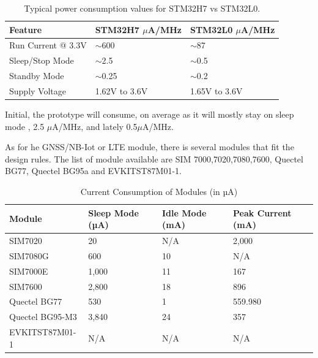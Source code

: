 \begin{table}[h!]
    \centering
    \begin{tabular}{l|l|l}
    Feature & STM32H7 $\mu$A/MHz& STM32L0 $\mu$A/MHz\\ 
    \hline
    Run Current @ 3.3V & $\sim$600      & $\sim$87 \\
    Sleep/Stop Mode    & $\sim$2.5      & $\sim$0.5 \\
    Standby Mode       & $\sim$0.25     & $\sim$0.2 \\
    Supply Voltage     & 1.62V to 3.6V  & 1.65V to 3.6V \\
    \end{tabular}
    \caption{Typical power consumption values for STM32H7 vs STM32L0.}
    \label{table:Typical power consumption values for STM32H7 vs STM32L0.}

\end{table}

Initial, the prototype will consume, on average as it will mostly stay on sleep mode
, 2.5 $\mu$A/MHz, and lately 0.5$\mu$A/MHz. 

As for he GNSS/NB-Iot or LTE module, there is several modules that fit the design rules.
The list of module available are SIM 7000,7020,7080,7600, Quectel BG77, Quectel BG95a 
and EVKITST87M01-1.

\begin{table}[h!]
    \centering
    \begin{tabular}{l|l|l|l}
    \textbf{Module} & \textbf{Sleep Mode (µA)} & \textbf{Idle Mode (mA)} & \textbf{Peak Current (mA)} \\
    \hline
    SIM7020         & 20                      & N/A                & 2,000 \\
    SIM7080G        & 600                     & 10                 & N/A       \\
    SIM7000E        & 1,000                   & 11                 & 167   \\
    SIM7600         & 2,800                   & 18                 & 896   \\
    Quectel BG77    & 530                     & 1                  & 559.980   \\
    Quectel BG95-M3 & 3,840                   & 24                 & 357   \\
    EVKITST87M01-1  & N/A                     & N/A                & N/A       \\
    \end{tabular}
    \caption{Current Consumption of Modules (in µA)}
    \label{table:Current Consumption of Modules (in µA)}
\end{table}

